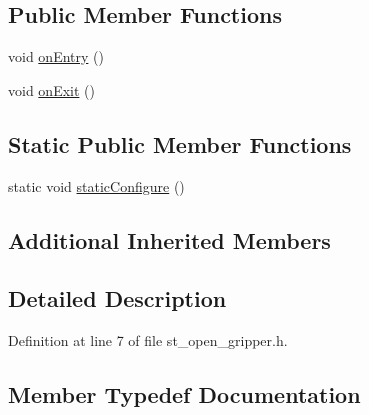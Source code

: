 \subsection*{Public Member Functions}
\begin{DoxyCompactItemize}
\item 
void \hyperlink{structsm__fetch__six__table__pick__n__sort__1_1_1place__states_1_1StOpenGripper_addfea02ce1cc2276d23f8ea6dcf4d306}{on\+Entry} ()
\item 
void \hyperlink{structsm__fetch__six__table__pick__n__sort__1_1_1place__states_1_1StOpenGripper_a1eda8dc8ed7fcc7701dfb7fbd1a38a88}{on\+Exit} ()
\end{DoxyCompactItemize}
\subsection*{Static Public Member Functions}
\begin{DoxyCompactItemize}
\item 
static void \hyperlink{structsm__fetch__six__table__pick__n__sort__1_1_1place__states_1_1StOpenGripper_a709a36260de1d6af493baea98b38704c}{static\+Configure} ()
\end{DoxyCompactItemize}
\subsection*{Additional Inherited Members}


\subsection{Detailed Description}


Definition at line 7 of file st\+\_\+open\+\_\+gripper.\+h.



\subsection{Member Typedef Documentation}
\mbox{\label{structsm__fetch__six__table__pick__n__sort__1_1_1place__states_1_1StOpenGripper_a49f9a5e52b6e2492a9bc3c3a0cb36297}} 
